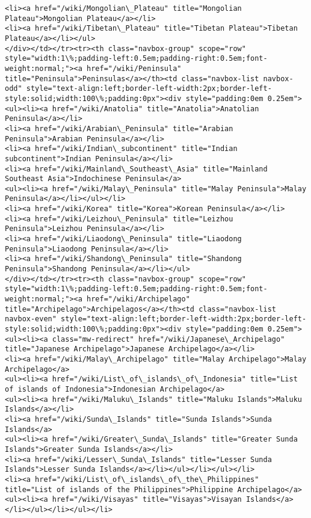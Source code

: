 \documentclass[11pt]{article}
\begin{document}
\begin{Verbatim}[commandchars=\\\{\}]
<li><a href="/wiki/Mongolian\_Plateau" title="Mongolian Plateau">Mongolian Plateau</a></li>
<li><a href="/wiki/Tibetan\_Plateau" title="Tibetan Plateau">Tibetan Plateau</a></li></ul>
</div></td></tr><tr><th class="navbox-group" scope="row" style="width:1\%;padding-left:0.5em;padding-right:0.5em;font-weight:normal;"><a href="/wiki/Peninsula" title="Peninsula">Peninsulas</a></th><td class="navbox-list navbox-odd" style="text-align:left;border-left-width:2px;border-left-style:solid;width:100\%;padding:0px"><div style="padding:0em 0.25em">
<ul><li><a href="/wiki/Anatolia" title="Anatolia">Anatolian Peninsula</a></li>
<li><a href="/wiki/Arabian\_Peninsula" title="Arabian Peninsula">Arabian Peninsula</a></li>
<li><a href="/wiki/Indian\_subcontinent" title="Indian subcontinent">Indian Peninsula</a></li>
<li><a href="/wiki/Mainland\_Southeast\_Asia" title="Mainland Southeast Asia">Indochinese Peninsula</a>
<ul><li><a href="/wiki/Malay\_Peninsula" title="Malay Peninsula">Malay Peninsula</a></li></ul></li>
<li><a href="/wiki/Korea" title="Korea">Korean Peninsula</a></li>
<li><a href="/wiki/Leizhou\_Peninsula" title="Leizhou Peninsula">Leizhou Peninsula</a></li>
<li><a href="/wiki/Liaodong\_Peninsula" title="Liaodong Peninsula">Liaodong Peninsula</a></li>
<li><a href="/wiki/Shandong\_Peninsula" title="Shandong Peninsula">Shandong Peninsula</a></li></ul>
</div></td></tr><tr><th class="navbox-group" scope="row" style="width:1\%;padding-left:0.5em;padding-right:0.5em;font-weight:normal;"><a href="/wiki/Archipelago" title="Archipelago">Archipelagos</a></th><td class="navbox-list navbox-even" style="text-align:left;border-left-width:2px;border-left-style:solid;width:100\%;padding:0px"><div style="padding:0em 0.25em">
<ul><li><a class="mw-redirect" href="/wiki/Japanese\_Archipelago" title="Japanese Archipelago">Japanese Archipelago</a></li>
<li><a href="/wiki/Malay\_Archipelago" title="Malay Archipelago">Malay Archipelago</a>
<ul><li><a href="/wiki/List\_of\_islands\_of\_Indonesia" title="List of islands of Indonesia">Indonesian Archipelago</a>
<ul><li><a href="/wiki/Maluku\_Islands" title="Maluku Islands">Maluku Islands</a></li>
<li><a href="/wiki/Sunda\_Islands" title="Sunda Islands">Sunda Islands</a>
<ul><li><a href="/wiki/Greater\_Sunda\_Islands" title="Greater Sunda Islands">Greater Sunda Islands</a></li>
<li><a href="/wiki/Lesser\_Sunda\_Islands" title="Lesser Sunda Islands">Lesser Sunda Islands</a></li></ul></li></ul></li>
<li><a href="/wiki/List\_of\_islands\_of\_the\_Philippines" title="List of islands of the Philippines">Philippine Archipelago</a>
<ul><li><a href="/wiki/Visayas" title="Visayas">Visayan Islands</a></li></ul></li></ul></li>

\end{Verbatim}
\end{document}
